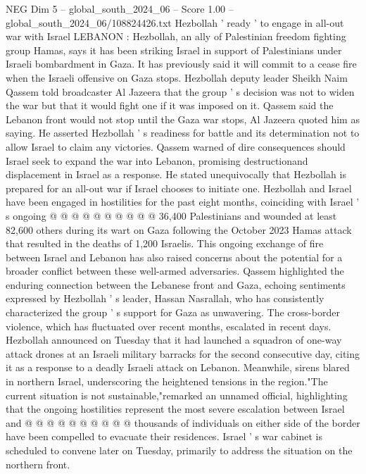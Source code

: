 \begin{textsample}{NEG Dim 5 – global\_south\_2024\_06 – Score 1.00 – global\_south\_2024\_06/108824426.txt}  \label{ex:f5_neg_237}
Hezbollah ' ready ' to engage in all-out war with Israel LEBANON : Hezbollah, an ally of Palestinian freedom fighting group Hamas, says it has been striking Israel in support of Palestinians under Israeli bombardment in Gaza.
It has previously said it will commit to a cease fire when the Israeli offensive on Gaza stops.
Hezbollah deputy leader Sheikh Naim Qassem told broadcaster Al Jazeera that the group ' s decision was not to widen the war but that it would fight one if it was imposed on it.
Qassem said the Lebanon front would not stop until the Gaza war stops, Al Jazeera quoted him as saying.
He asserted Hezbollah ' s readiness for battle and its determination not to allow Israel to claim any victories.
Qassem warned of dire consequences should Israel seek to expand the war into Lebanon, promising destructionand displacement in Israel as a response.
He stated unequivocally that Hezbollah is prepared for an all-out war if Israel chooses to initiate one.
Hezbollah and Israel have been engaged in hostilities for the past eight months, coinciding with Israel ' s ongoing @ @ @ @ @ @ @ @ @ @ 36,400 Palestinians and wounded at least 82,600 others during its wart on Gaza following the October 2023 Hamas attack that resulted in the deaths of 1,200 Israelis.
This ongoing exchange of fire between Israel and Lebanon has also raised concerns about the potential for a broader conflict between these well-armed adversaries.
Qassem highlighted the enduring connection between the Lebanese front and Gaza, echoing sentiments expressed by Hezbollah ' s leader, Hassan Nasrallah, who has consistently characterized the group ' s support for Gaza as unwavering.
The cross-border violence, which has fluctuated over recent months, escalated in recent days.
Hezbollah announced on Tuesday that it had launched a squadron of one-way attack drones at an Israeli military barracks for the second consecutive day, citing it as a response to a deadly Israeli attack on Lebanon.
Meanwhile, sirens blared in northern Israel, underscoring the heightened tensions in the region."The current situation is not sustainable,"remarked an unnamed official, highlighting that the ongoing hostilities represent the most severe escalation between Israel and @ @ @ @ @ @ @ @ @ @ thousands of individuals on either side of the border have been compelled to evacuate their residences.
Israel ' s war cabinet is scheduled to convene later on Tuesday, primarily to address the situation on the northern front.

\end{textsample}
